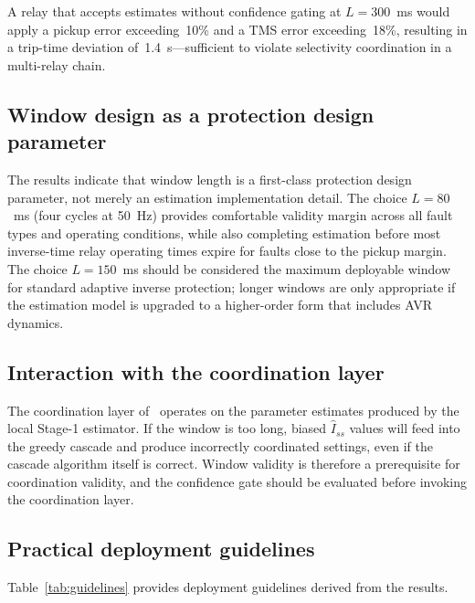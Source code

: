 \documentclass[journal,twoside,letterpaper]{IEEEtran}
\begin{document}
A relay that accepts estimates without confidence gating at
$L = 300$~ms would apply a pickup error exceeding~10\% and
a TMS error exceeding~18\%, resulting in a trip-time
deviation of~1.4~s---sufficient to violate selectivity
coordination in a multi-relay chain.

\subsection{Window design as a protection design parameter}

The results indicate that window length is a first-class
protection design parameter, not merely an estimation
implementation detail.
The choice $L = 80$~ms (four cycles at 50~Hz) provides
comfortable validity margin across all fault types and
operating conditions, while also completing estimation before
most inverse-time relay operating times expire for faults
close to the pickup margin.
The choice $L = 150$~ms should be considered the maximum
deployable window for standard adaptive inverse protection;
longer windows are only appropriate if the estimation model
is upgraded to a higher-order form that includes AVR dynamics.

\subsection{Interaction with the coordination layer}

The coordination layer of~\cite{Eluvathingal2026_TR05} operates
on the parameter estimates produced by the local Stage-1
estimator.
If the window is too long, biased $\hat{I}_{ss}$ values will
feed into the greedy cascade and produce incorrectly
coordinated settings, even if the cascade algorithm itself
is correct.
Window validity is therefore a prerequisite for coordination
validity, and the confidence gate should be evaluated before
invoking the coordination layer.

\subsection{Practical deployment guidelines}

Table~\ref{tab:guidelines} provides deployment guidelines
derived from the results.
\end{document}
